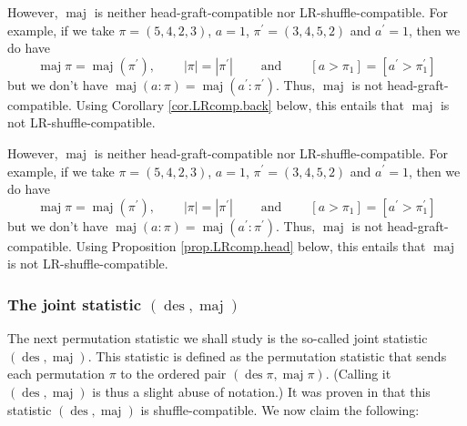 \documentclass[numbers=enddot,12pt,final,onecolumn,notitlepage]{scrartcl}%
\theoremstyle{definition}
\newenvironment{verlong}{}{}
\newenvironment{vershort}{}{}
\begin{document}
\begin{vershort}
However, $\operatorname*{maj}$ is neither head-graft-compatible nor
LR-shuffle-compatible. For example, if we take $\pi=\left(  5,4,2,3\right)  $,
$a=1$, $\pi^{\prime}=\left(  3,4,5,2\right)  $ and $a^{\prime}=1$, then we do
have%
\[
\operatorname*{maj} \pi =\operatorname*{maj}\left(  \pi
^{\prime}\right)  ,\ \ \ \ \ \ \ \ \ \ \left\vert \pi\right\vert =\left\vert
\pi^{\prime}\right\vert \ \ \ \ \ \ \ \ \ \ \text{and}%
\ \ \ \ \ \ \ \ \ \ \left[  a>\pi_{1}\right]  =\left[  a^{\prime}>\pi
_{1}^{\prime}\right]
\]
but we don't have $\operatorname*{maj}\left(  a:\pi\right)
=\operatorname*{maj}\left(  a^{\prime}:\pi^{\prime}\right)  $. Thus,
$\operatorname*{maj}$ is not head-graft-compatible. Using Corollary
\ref{cor.LRcomp.back} below, this entails that
$\operatorname*{maj}$ is not LR-shuffle-compatible.
\end{vershort}

\begin{verlong}
However, $\operatorname*{maj}$ is neither head-graft-compatible nor
LR-shuffle-compatible. For example, if we take $\pi=\left(  5,4,2,3\right)  $,
$a=1$, $\pi^{\prime}=\left(  3,4,5,2\right)  $ and $a^{\prime}=1$, then we do
have%
\[
\operatorname*{maj} \pi = \operatorname*{maj}\left(  \pi
^{\prime}\right)  ,\ \ \ \ \ \ \ \ \ \ \left\vert \pi\right\vert =\left\vert
\pi^{\prime}\right\vert \ \ \ \ \ \ \ \ \ \ \text{and}%
\ \ \ \ \ \ \ \ \ \ \left[  a>\pi_{1}\right]  =\left[  a^{\prime}>\pi
_{1}^{\prime}\right]
\]
but we don't have $\operatorname*{maj}\left(  a:\pi\right)
=\operatorname*{maj}\left(  a^{\prime}:\pi^{\prime}\right)  $. Thus,
$\operatorname*{maj}$ is not head-graft-compatible. Using Proposition
\ref{prop.LRcomp.head} below, this entails that $\operatorname*{maj}$ is not LR-shuffle-compatible.
\end{verlong}

\subsubsection{The joint statistic $\left(  \operatorname{des}
,\operatorname*{maj}\right)  $}

The next permutation statistic we shall study is the so-called joint statistic
$\left(  \operatorname{des},\operatorname*{maj}\right)  $. This statistic is
defined as the permutation statistic that sends each permutation $\pi$ to the
ordered pair $\left(  \operatorname{des}\pi,\operatorname*{maj}\pi\right)  $.
(Calling it $\left(  \operatorname{des},\operatorname*{maj}\right)  $ is thus
a slight abuse of notation.) It was proven in \cite[Theorem 4.5 \textbf{(a)}%
]{part1} that this statistic $\left(  \operatorname{des},\operatorname{maj}%
\right)  $ is shuffle-compatible. We now claim the following:
\end{document}
